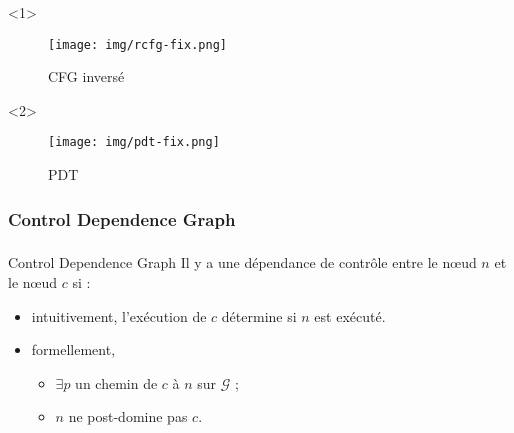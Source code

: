 \documentclass{beamer}
\begin{document}
      \begin{frame}
        \frametitle{\subsecname}
        \framesubtitle{\subsubsecname}

        \begin{onlyenv}<1>
          \begin{figure}
            \centering
            \texttt{[image: img/rcfg-fix.png]}
            \caption{CFG inversé}
          \end{figure}
        \end{onlyenv}
        
        \begin{onlyenv}<2>
          \begin{figure}
            \centering


            \texttt{[image: img/pdt-fix.png]}
            \caption{PDT}
          \end{figure}
        \end{onlyenv}
      \end{frame}

    
      \subsubsection*{Control Dependence Graph}
      \begin{frame}
        \frametitle{\subsecname}
        \framesubtitle{\subsubsecname}

        \begin{block}{Control Dependence Graph}
          Il y a une dépendance de contrôle entre le n{\oe}ud $n$ et le n{\oe}ud $c$ si :
          \begin{itemize}
            \item intuitivement, l'exécution de $c$ détermine si $n$ est exécuté.
            \item formellement, 
              \begin{itemize}
                \item $\exists p$ un chemin de $c$ à $n$ sur $\mathcal{G}$ ;
                \item $n$ ne post-domine pas $c$.
              \end{itemize}
          \end{itemize}
        \end{block}
      \end{frame}
\end{document}
